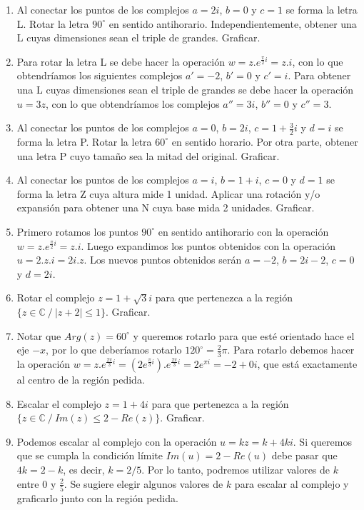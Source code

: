 \documentclass[a4paper]{article}
\newcommand{\answer}{\item[**]}
\newcommand{\df}[2]{\displaystyle\frac{#1}{#2}}
\begin{document}
\begin{enumerate}
\begin{enumerate} [label=(\alph*)]
		\item Al conectar los puntos de los complejos $a=2i$, $b=0$ y $c=1$ se forma la letra L. Rotar la letra $90^{\circ}$ en sentido antihorario. Independientemente, obtener una L cuyas dimensiones sean el triple de grandes. Graficar.
		\answer Para rotar la letra L se debe hacer la operación $w=z.e^{\frac{\pi}{2}i}=z.i$, con lo que obtendríamos los siguientes complejos $a'=-2$, $b'=0$ y $c'=i$. Para obtener una L cuyas dimensiones sean el triple de grandes se debe hacer la operación $u=3z$, con lo que obtendríamos los complejos $a''=3i$, $b''=0$ y $c''=3$. 

		\item Al conectar los puntos de los complejos $a=0$, $b=2i$, $c=1+\df{3}{2}i$ y $d=i$ se forma la letra P. Rotar la letra $60^{\circ}$ en sentido horario. Por otra parte, obtener una letra P cuyo tamaño sea la mitad del original. Graficar.

		\item Al conectar los puntos de los complejos $a=i$, $b=1+i$, $c=0$ y $d=1$ se forma la letra Z cuya altura mide 1 unidad. Aplicar una rotación y/o expansión para obtener una N cuya base mida 2 unidades. Graficar.
		\answer Primero rotamos los puntos $90^{\circ}$ en sentido antihorario con la operación $w=z.e^{\frac{\pi}{2}i}=z.i$. Luego expandimos los puntos obtenidos con la operación $u=2.z.i=2i.z$. Los nuevos puntos obtenidos serán $a=-2$, $b=2i-2$, $c=0$ y $d=2i$.

		\item Rotar el complejo $z=1+\sqrt{3}i$ para que pertenezca a la región $\{ z \in \mathbb{C} ~/~ |z+2| \leq 1 \}$. Graficar.
		\answer Notar que $Arg(z) = 60^{\circ}$ y queremos rotarlo para que esté orientado hace el eje $-x$, por lo que deberíamos rotarlo $120^{\circ}=\df{2}{3}\pi$. Para rotarlo debemos hacer la operación $w=z.e^{\frac{2\pi}{3}i} = \left(2e^{\frac{\pi}{3}i}\right).e^{\frac{2\pi}{3}i} =2e^{\pi i}=-2+0i$, que está exactamente al centro de la región pedida.

		\item Escalar el complejo $z=1+4i$ para que pertenezca a la región $\{ z \in \mathbb{C} ~/~ Im(z) \leq 2 - Re(z) \}$. Graficar.
		\answer Podemos escalar al complejo con la operación $u=kz=k+4ki$. Si queremos que se cumpla la condición límite $Im(u) = 2 - Re(u)$ debe pasar que $4k=2-k$, es decir, $k=2/5$. Por lo tanto, podremos utilizar valores de $k$ entre $0$ y $\df{2}{5}$. Se sugiere elegir algunos valores de $k$ para escalar al complejo y graficarlo junto con la región pedida.


\end{enumerate}
\end{enumerate}
\end{document}
